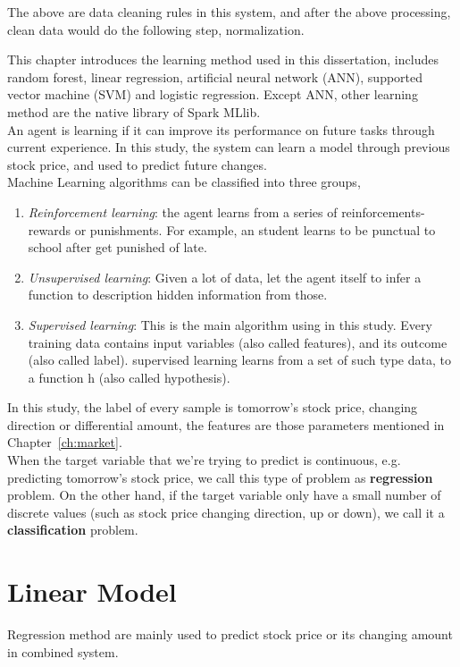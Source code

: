 The above are data cleaning rules in this system, and after the above processing, clean data would do the following step, normalization.


This chapter introduces the learning method used in this dissertation, includes random forest, linear regression, artificial neural network (ANN), supported vector machine (SVM) and logistic regression. Except ANN, other learning method are the native library of Spark MLlib.\\


An agent is learning if it can improve its performance on future tasks through current experience\cite{russell2003artificial}. In this study, the system can learn a model through previous stock price, and used to predict future changes.\\


Machine Learning algorithms can be classified into three groups\cite{russell2003artificial}, 
\begin{enumerate}
	\item \textit{Reinforcement learning}: the agent learns from a series of reinforcements-rewards or punishments. For example, an student learns to be punctual to school after get punished of late.
	\item \textit{Unsupervised learning}: Given a lot of data, let the agent itself to infer a function to description hidden information from those.
	\item \textit{Supervised learning}: This is the main algorithm using in this study. Every training data contains input variables (also called features), and its outcome (also called label). supervised learning learns from a set of such type data, to a function h (also called hypothesis).
\end{enumerate}


In this study, the label of every sample is tomorrow's stock price, changing direction or differential amount, the features are those parameters mentioned in Chapter~\ref{ch:market}.\\


When the target variable that we're trying to predict is continuous, e.g. predicting tomorrow's stock price, we call this type of problem as \textbf{regression} problem. On the other hand, if the target variable only have a small number of discrete values (such as stock price changing direction, up or down), we call it a \textbf{classification} problem.


\section{Linear Model}
Regression method are mainly used to predict stock price or its changing amount in combined system.


